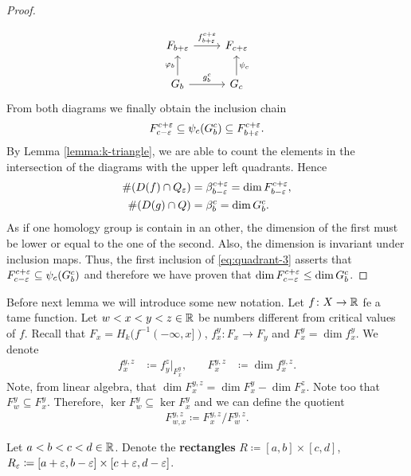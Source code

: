 \begin{proof}
\begin{align}
    \end{align}
    \begin{equation} \label{cd:quadrant-2}
    \begin{tikzcd}
        F_{b+\e} \arrow[r, "f_{b+\e}^{c+\e}"]
        & F_{c+\e} \\
        G_b \arrow[r, "g_b^c"] \arrow[u, "\varphi_{b}"]
        & G_c \arrow[u, "\psi_c"']        
    \end{tikzcd}
    \end{equation}
    From both diagrams we finally obtain the inclusion chain
    \begin{align}  \label{eq:quadrant-3}
        F_{c-\varepsilon}^{c+\varepsilon} \subseteq \psi_c (G_b^c) \subseteq F_{b+\varepsilon}^{c+\varepsilon}.
    \end{align}
    By Lemma \ref{lemma:k-triangle}, we are able to count the elements in the intersection of the diagrams with the upper left quadrants. Hence
    \begin{align}
        \#(D(f) \cap Q_\varepsilon) &= \beta_{b-\varepsilon}^{c+\varepsilon} = \dim F_{b-\varepsilon}^{c+\varepsilon}, \\
        \#(D(g) \cap Q) &= \beta_b^c = \dim G_b^c.
    \end{align}
    As if one homology group is contain in an other, the dimension of the first must be lower or equal to the one of the second. Also, the dimension is invariant under inclusion maps. Thus, the first inclusion of \eqref{eq:quadrant-3} asserts that $ F_{c-\varepsilon}^{c+\varepsilon} \subseteq \psi_c (G_b^c) $ and therefore we have proven that $ \dim F_{c-\varepsilon}^{c+\varepsilon} \leq  \dim G_b^c $.
\end{proof}

Before next lemma we will introduce some new notation. Let $ f\colon X \to \mathbb R $ fe a tame function. Let $ w < x < y < z \in \mathbb R $ be numbers different from critical values of $ f $. Recall that $ F_x = H_k(f^{-1}(-\infty, x]) $, $ f_x^y \colon F_x \to F_y $ and $ F_x^y = \dim f_x^y $. We denote
\begin{align}
    f_x^{y, z} &\coloneq f_y^z \rvert_{F_x^y},
    \quad &
    F_x^{y, z} &\coloneq \dim f_x^{y, z}.
\end{align}
Note, from linear algebra, that $ \dim F_x^{y,z} = \dim F_x^y - \dim F_x^z $. Note too that $ F_w^y \subseteq F_x^y $. Therefore, $ \ker F_w^y \subseteq \ker F_x^y $ and we can define the quotient
\begin{align}
    F_{w,x}^{y,z} \coloneq F_x^{y,z} / F_w^{y,z}.
\end{align}

Let $ a < b < c < d \in \mathbb R $. Denote the {\bf rectangles} $ R \coloneq [a, b] \times [c, d] $, $ R_\varepsilon \coloneq [a+\varepsilon, b-\varepsilon] \times [c+\varepsilon, d -\varepsilon] $.

